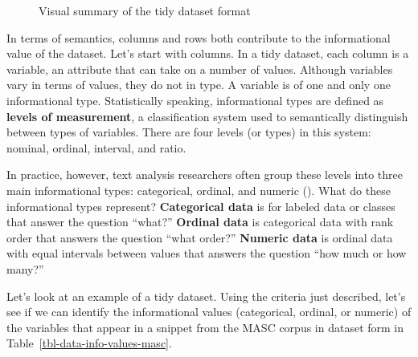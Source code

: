 \documentclass[
  letterpaper,
  krantz1]{latex/krantz-mod}
\theoremstyle{definition}
\theoremstyle{definition}
\theoremstyle{remark}
\begin{document}
\begin{figure}[!htb]


\caption{\label{fig-data-tidy-format-image}Visual summary of the tidy
dataset format}

\end{figure}%

In terms of semantics, columns and rows both contribute to the
informational value of the dataset. Let's start with columns. In a tidy
dataset, each column is a variable, an attribute that can take on a
number of values. Although variables vary in terms of values, they do
not in type. A variable is of one and only one
informational type. Statistically speaking,
informational types are defined as \textbf{levels of
measurement}, a classification system used
to semantically distinguish between types of variables. There are four
levels (or types) in this system: nominal, ordinal, interval, and ratio.

In practice, however, text analysis researchers often group these levels
into three main informational types: categorical, ordinal, and numeric
(). What do these informational
types represent? \textbf{Categorical data} is for labeled data or
classes that answer the question ``what?'' \textbf{Ordinal data} is
categorical data with rank order that answers the question ``what
order?'' \textbf{Numeric data} is ordinal data with equal intervals
between values that answers the question ``how much or how many?''

Let's look at an example of a tidy dataset. Using the
criteria just described, let's see if we can identify the informational
values (categorical,
ordinal, or numeric)
of the variables that appear in a snippet from the MASC
corpus
in dataset form in Table~\ref{tbl-data-info-values-masc}.
\end{document}
